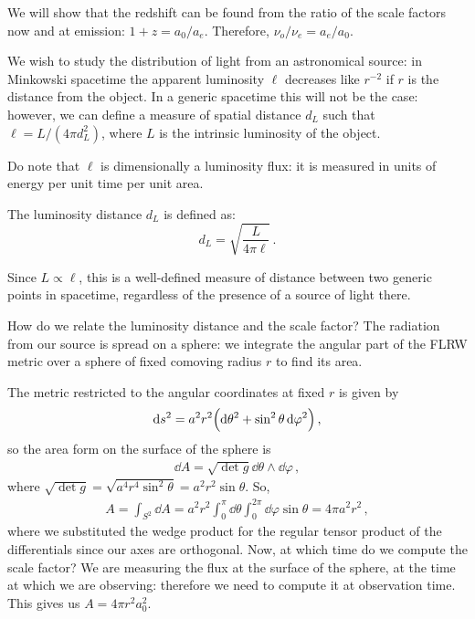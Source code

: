 \documentclass[main.tex]{subfiles}
\begin{document}
We will show
that the redshift can be found from the ratio of the scale factors now and at emission: \(1+z = a_0/ a_e\).
Therefore, \(\nu_o / \nu_e = a_e / a_0\).

We wish to study the distribution of light from an astronomical source: in Minkowski spacetime the apparent luminosity \(\ell\) decreases like \(r^{-2}\) if \(r\) is the distance from the object.
In a generic spacetime this will not be the case: however, we can define a measure of spatial distance \(d_L\) such that \(\ell = L / (4 \pi d_L^2)\), where \(L\) is the intrinsic luminosity of the object.

Do note that \(\ell \) is dimensionally a luminosity flux: it is measured in units of energy per unit time per unit area.

\begin{definition}  
The luminosity distance \(d_L\) is defined as:
%
\begin{equation}
d_L = \sqrt{\frac{L}{4 \pi \ell} } \,.
\end{equation}

Since \(L \propto \ell\), this is a well-defined measure of distance between two generic points in spacetime, regardless of the presence of a source of light there.
\end{definition}
  
How do we relate the luminosity distance and the scale factor?
The radiation from our source is spread on a sphere: we integrate the angular part of the FLRW metric over a sphere of fixed comoving radius \(r\) to find its area.

The metric restricted to the angular coordinates at fixed \(r\) is given by 
%
\begin{align}
\dd{s^2} = a^2 r^2 \qty(\dd{\theta^2} + \sin^2\theta \dd{\varphi^2})
\,,
\end{align}
%
so the area form on the surface of the sphere is 
%
\begin{align}
\dd{A} = \sqrt{ \det g} \dd{\theta } \wedge \dd{\varphi }
\,,
\end{align}
%
where \(\sqrt{ \det g} = \sqrt{a^{4} r^{4} \sin^2\theta } = a^2r^2 \sin \theta \). 
So,
%
\begin{align}
A = \int_{S^{2}}  \dd{A} = a^2r^2 \int_{0}^{\pi } \dd{\theta } \int_{0}^{2 \pi } \dd{\varphi } \sin \theta = 4 \pi a^2r^2 
\,,
\end{align}
%
where we substituted the wedge product for the regular tensor product of the differentials since our axes are orthogonal.
Now, at which time do we compute the scale factor? We are measuring the flux at the surface of the sphere, at the time at which we are observing: therefore we need to compute it at observation time. This gives us \(A = 4 \pi r^2a_0^2\).
\end{document}
